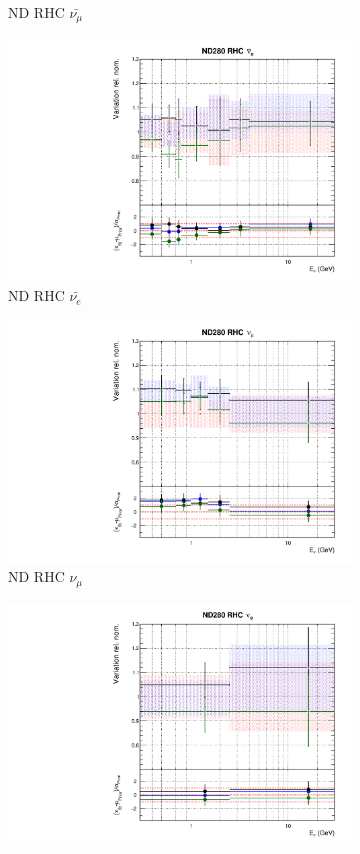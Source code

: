 \begin{figure}
\begin{subfigure}{0.24\textwidth}
  \caption{ND RHC $\bar{\nu_{\mu}}$}
\end{subfigure}
\begin{subfigure}{0.24\textwidth}
  \centering
  \includegraphics[width=0.95\linewidth]{figs/fhcrhcfitsflux_5}
  \caption{ND RHC $\bar{\nu_{e}}$}
\end{subfigure}
\begin{subfigure}{0.24\textwidth}
  \centering
  \includegraphics[width=0.95\linewidth]{figs/fhcrhcfitsflux_6}
  \caption{ND RHC $\nu_{\mu}$}
\end{subfigure}
\vspace{15mm}
\begin{subfigure}{0.24\textwidth}
  \centering
  \includegraphics[width=0.95\linewidth]{figs/fhcrhcfitsflux_7}

\end{subfigure}
\end{figure}
